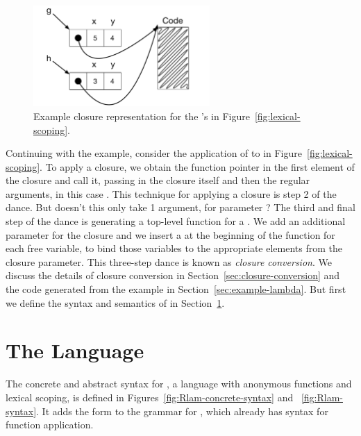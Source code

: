 \documentclass[11pt]{book}
\begin{document}
\begin{figure}[tbp]
\centering \includegraphics[width=0.6\textwidth]{figs/closures}
\caption{Example closure representation for the 's
  in Figure~\ref{fig:lexical-scoping}.}
\label{fig:closures}
\end{figure}

Continuing with the example, consider the application of  to
 in Figure~\ref{fig:lexical-scoping}.  To apply a closure, we
obtain the function pointer in the first element of the closure and
call it, passing in the closure itself and then the regular arguments,
in this case . This technique for applying a closure is step
2 of the dance.
%
But doesn't this  only take 1 argument, for parameter
? The third and final step of the dance is generating a
top-level function for a .  We add an additional
parameter for the closure and we insert a  at the beginning
of the function for each free variable, to bind those variables to the
appropriate elements from the closure parameter.
%
This three-step dance is known as \emph{closure conversion}.  We
discuss the details of closure conversion in
Section~\ref{sec:closure-conversion} and the code generated from the
example in Section~\ref{sec:example-lambda}. But first we define the
syntax and semantics of \LangLam{} in Section~\ref{sec:r5}.

\section{The \LangLam{} Language}
\label{sec:r5}

The concrete and abstract syntax for \LangLam{}, a language with anonymous
functions and lexical scoping, is defined in
Figures~\ref{fig:Rlam-concrete-syntax} and ~\ref{fig:Rlam-syntax}. It adds
the  form to the grammar for \LangFun{}, which already has
syntax for function application.
\end{document}
